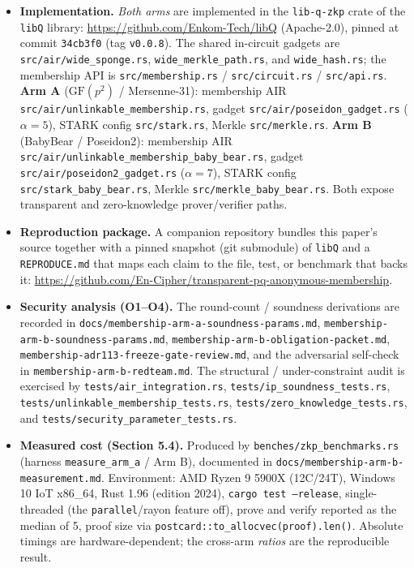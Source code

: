 \documentclass[11pt]{article}
\newcommand{\GF}[1]{\mathrm{GF}(#1)}
\theoremstyle{plain}
\theoremstyle{definition}
\begin{document}
\begin{itemize}[leftmargin=*]
\item \textbf{Implementation.} \emph{Both arms} are implemented in the \texttt{lib-q-zkp} crate of the
  \texttt{libQ} library: \url{https://github.com/Enkom-Tech/libQ} (Apache-2.0), pinned at commit
  \texttt{34cb3f0} (tag \texttt{v0.0.8}). The shared in-circuit gadgets are \texttt{src/air/wide\_sponge.rs},
  \texttt{wide\_merkle\_path.rs}, and \texttt{wide\_hash.rs}; the membership API is
  \texttt{src/membership.rs} / \texttt{src/circuit.rs} / \texttt{src/api.rs}. \textbf{Arm A}
  (\(\GF{p^2}\) / Mersenne-31): membership AIR \texttt{src/air/unlinkable\_membership.rs}, gadget
  \texttt{src/air/poseidon\_gadget.rs} (\(\alpha=5\)), STARK config \texttt{src/stark.rs}, Merkle
  \texttt{src/merkle.rs}. \textbf{Arm B} (BabyBear / Poseidon2): membership AIR
  \texttt{src/air/unlinkable\_membership\_baby\_bear.rs}, gadget \texttt{src/air/poseidon2\_gadget.rs}
  (\(\alpha=7\)), STARK config \texttt{src/stark\_baby\_bear.rs}, Merkle
  \texttt{src/merkle\_baby\_bear.rs}. Both expose transparent and zero-knowledge prover/verifier paths.
\item \textbf{Reproduction package.} A companion repository bundles this paper's source together with
  a pinned snapshot (git submodule) of \texttt{libQ} and a \texttt{REPRODUCE.md} that maps each claim
  to the file, test, or benchmark that backs it:
  \url{https://github.com/En-Cipher/transparent-pq-anonymous-membership}.
\item \textbf{Security analysis (O1--O4).} The round-count / soundness derivations are recorded in
  \texttt{docs/membership-arm-a-soundness-params.md}, \texttt{membership-arm-b-soundness-params.md},
  \texttt{membership-arm-b-obligation-packet.md}, \texttt{membership-adr113-freeze-gate-review.md},
  and the adversarial self-check in \texttt{membership-arm-b-redteam.md}. The structural /
  under-constraint audit is exercised by \texttt{tests/air\_integration.rs},
  \texttt{tests/ip\_soundness\_tests.rs}, \texttt{tests/unlinkable\_membership\_tests.rs},
  \texttt{tests/zero\_knowledge\_tests.rs}, and \texttt{tests/security\_parameter\_tests.rs}.
\item \textbf{Measured cost (Section 5.4).} Produced by \texttt{benches/zkp\_benchmarks.rs} (harness
  \texttt{measure\_arm\_a} / Arm B), documented in \texttt{docs/membership-arm-b-measurement.md}.
  Environment: AMD Ryzen 9 5900X (12C/24T), Windows 10 IoT x86\_64, Rust 1.96 (edition 2024),
  \texttt{cargo test --release}, single-threaded (the \texttt{parallel}/rayon feature off), prove and
  verify reported as the median of 5, proof size via \texttt{postcard::to\_allocvec(proof).len()}.
  Absolute timings are hardware-dependent; the cross-arm \emph{ratios} are the reproducible result.
\end{itemize}
\end{document}

